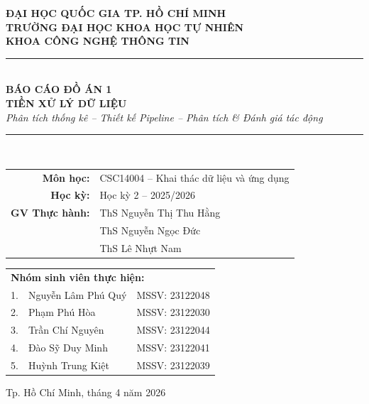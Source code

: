 \documentclass[12pt,a4paper]{article}
\title{}
\author{}
\date{}
\let\oldtextbf\textbf
\renewcommand{\textbf}[1]{\oldtextbf{\textcolor{hcmublue}{#1}}}
\begin{document}
\begin{titlepage}
    \centering
    \vspace*{0.5cm}

    {\Large \textbf{ĐẠI HỌC QUỐC GIA TP. HỒ CHÍ MINH}}\\[0.3cm]
    {\Large \textbf{TRƯỜNG ĐẠI HỌC KHOA HỌC TỰ NHIÊN}}\\[0.3cm]
    {\Large \textbf{KHOA CÔNG NGHỆ THÔNG TIN}}\\[1.2cm]


    \rule{\linewidth}{0.5mm}\\[0.4cm]
    {\huge \textbf{BÁO CÁO ĐỒ ÁN 1}}\\[0.3cm]
    {\LARGE \textbf{TIỀN XỬ LÝ DỮ LIỆU}}\\[0.2cm]
    {\large \textit{Phân tích thống kê -- Thiết kế Pipeline -- Phân tích \& Đánh giá tác động}}\\[0.4cm]
    \rule{\linewidth}{0.5mm}\\[1.2cm]

    \begin{tabular}{rl}
        \textbf{Môn học:}  & CSC14004 -- Khai thác dữ liệu và ứng dụng\\[0.2cm]
        \textbf{Học kỳ:}   & Học kỳ 2 -- 2025/2026\\[0.2cm]
        \textbf{GV Thực hành:} & ThS Nguyễn Thị Thu Hằng\\
                           & ThS Nguyễn Ngọc Đức\\
                           & ThS Lê Nhựt Nam
    \end{tabular}

    \vfill

    \begin{tabular}{r p{6cm} l}
        \multicolumn{3}{l}{\textbf{\large Nhóm sinh viên thực hiện:}}\\[0.5cm]
        1. & Nguyễn Lâm Phú Quý  & MSSV: 23122048 \\
        2. & Phạm Phú Hòa         & MSSV: 23122030 \\
        3. & Trần Chí Nguyên      & MSSV: 23122044 \\
        4. & Đào Sỹ Duy Minh      & MSSV: 23122041 \\
        5. & Huỳnh Trung Kiệt     & MSSV: 23122039 \\
    \end{tabular}

    \vfill
    {\large Tp. Hồ Chí Minh, tháng 4 năm 2026}
\end{titlepage}
\end{document}
